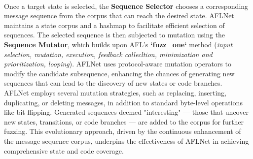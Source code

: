 \\Once a target state is selected, the \textbf{Sequence Selector} chooses a corresponding message sequence from the corpus that can reach the desired state. AFLNet maintains a state corpus and a hashmap to facilitate efficient selection of sequences. The selected sequence is then subjected to mutation using the \textbf{Sequence Mutator}, which builds upon AFL's \textbf{`fuzz\_one`} method (\textit{input selection, mutation, execution, feedback collecltion, minimization and prioritization, looping}). AFLNet uses protocol-aware mutation operators to modify the candidate subsequence, enhancing the chances of generating new sequences that can lead to the discovery of new states or code branches.
\\AFLNet employs several mutation strategies, such as replacing, inserting, duplicating, or deleting messages, in addition to standard byte-level operations like bit flipping. Generated sequences deemed "interesting" — those that uncover new states, transitions, or code branches — are added to the corpus for further fuzzing. This evolutionary approach, driven by the continuous enhancement of the message sequence corpus, underpins the effectiveness of AFLNet in achieving comprehensive state and code coverage.

